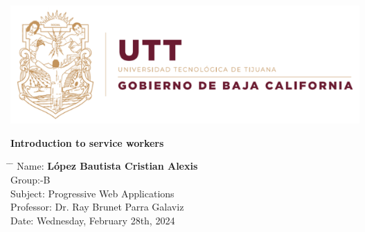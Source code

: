 \documentclass[12pt,a4paper]{article}
\title{}
\author{}
\date{}
\begin{document}
	
	\newcommand{\subf}[2]{%
		{\small\begin{tabular}[t]{@{}c@{}}
				#1\\#2
		\end{tabular}}%
	}
	
	\begin{titlepage}
		\begin{center}
			
			\textbf{}
            \includegraphics[width=1\textwidth]{utt.png}

            \vspace*{3cm}

			\vspace{1.5cm}
			
			\Huge
			\textbf{Introduction to service workers}
			
			\vspace{0.8cm}
			\large
			
			\vspace{0.5cm}
			\LARGE
			
			
			\vfill
			
			
			
			\vspace{0.8cm}
			
			
			
			\Large
			
			
			
			
		\end{center}
		\Large
		\begin{tabbing}
			\hspace*{1em}\= \hspace*{8em} \= \kill %
			\> Name:\>  \textbf{López Bautista Cristian Alexis} \\
			\> Group:\>  10-B \\
			\> Subject:\>  Progressive Web Applications  \\
			\> Professor:  \> Dr. Ray Brunet Parra Galaviz \\
			\> Date: \>  Wednesday, February 28th, 2024
		\end{tabbing}
		
	\end{titlepage}
	
\end{document}
